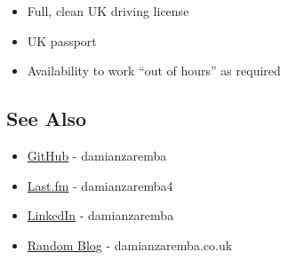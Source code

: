 \begin{itemize}
\item
  Full, clean UK driving license
\item
  UK passport
\item
  Availability to work ``out of hours'' as required
\end{itemize}
\subsection{See Also}

\begin{itemize}
\item
  \href{https://github.com/damianzaremba}{GitHub} - damianzaremba
\item
  \href{http://last.fm/user/damianzaremba4}{Last.fm} - damianzaremba4
\item
  \href{http://uk.linkedin.com/in/damianzaremba}{LinkedIn} -
  damianzaremba
\item
  \href{http://damianzaremba.co.uk}{Random Blog} - damianzaremba.co.uk
\end{itemize}
